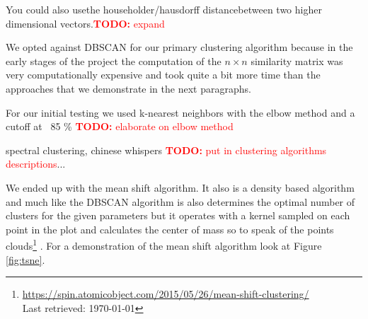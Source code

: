 \documentclass[journal]{vgtc}       %
\newcommand{\todo}[1]{\textcolor{red}{\textbf{TODO:} #1}}
\begin{document}
You could also usethe householder/hausdorff distancebetween two higher dimensional vectors.\todo{expand}

We opted against DBSCAN for our primary clustering algorithm because in the early stages of the project the computation of the \(n\times n\) similarity matrix was very computationally expensive and took quite a bit more time than the approaches that we demonstrate in the next paragraphs.


For our initial testing we used k-nearest neighbors with the elbow method and a cutoff at  ~85 \% \todo{elaborate on elbow method}

spectral clustering, chinese whispers  \todo{put in clustering algorithms descriptions}... 

We ended up with the mean shift algorithm. It also is a density based algorithm and much like the DBSCAN algorithm is also determines the optimal number of clusters for the given parameters but it operates with a kernel sampled on each point in the plot and calculates the center of mass so to speak of the points clouds\footnote{\url{https://spin.atomicobject.com/2015/05/26/mean-shift-clustering/}\\ Last retrieved: \today} . For a demonstration of the mean shift algorithm look at Figure \ref{fig:tsne}. 
\end{document}
